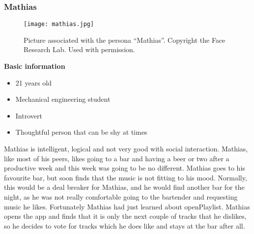 \subsubsection{Mathias}
\begin{figure}[hbtp]
  \centering
  \texttt{[image: mathias.jpg]}
  \caption{Picture associated with the persona \enquote{Mathias}. Copyright the Face Research Lab. Used with permission.}\label{fig:mathias}
\end{figure}
\noindent\textbf{Basic information}

\begin{itemize}
\item 21 years old
\item Mechanical engineering student
\item Introvert
\item Thoughtful person that can be shy at times
\end{itemize}

Mathias is intelligent, logical and not very good with social interaction. Mathias, like most of his peers, likes going to a bar and having a beer or two after a productive week and this week was going to be no different. Mathias goes to his favourite bar, but soon finds that the music is not fitting to his mood. Normally, this would be a deal breaker for Mathias, and he would find another bar for the night, as he was not really comfortable going to the bartender and requesting music he likes. Fortunately Mathias had just learned about openPlaylist. Mathias opens the app and finds that it is only the next couple of tracks that he dislikes, so he decides to vote for tracks which he does like and stays at the bar after all.
